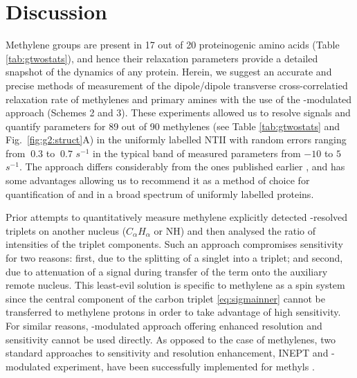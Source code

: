 \documentclass[twocolumn]{svjour3}           %
\begin{document}
\section{Discussion}
Methylene groups are present in 17 out of 20 proteinogenic amino acids
(Table \ref{tab:gtwostats}), and hence their relaxation parameters provide a detailed
snapshot of the dynamics of any protein. Herein, we suggest an accurate 
and precise methods of measurement of the dipole/dipole transverse
cross-correlatied relaxation rate \gtwo{} of me\-thy\-le\-nes and primary 
amines with 
the use of the \oneJch-modulated approach (Schemes 2 and 3). These 
experiments allowed us to resolve signals and
quantify \gtwoCH{} parameters for 89 out of 90 methylenes 
(see Table \ref{tab:gtwostats} and Fig.~\ref{fig:g2:struct}A) 
in the uniformly \nclab{} labelled {NTII} with random errors ranging 
from $~0.3$ to $~0.7$ $s^{-1}$ in the typical band of measured parameters 
from $-10$ to $5$ $s^{-1}$. The approach differs considerably from the ones
published earlier \cite{banci_side_2001,zheng_measurement_2004}, and has
some advantages allowing us to recommend it as a method of choice for
quantification of \gtwoCH{} and \gtwoNH{} in a broad spectrum of 
uniformly \nclab{} labelled proteins.

Prior attempts to quantitatively measure methylene \gtwoCH{} 
\cite{banci_side_2001,zheng_measurement_2004} explicitly detected
\oneJch-resolved triplets on another nucleus ($C_\alpha H_\alpha$ or NH) 
and then analysed the ratio of intensities of the triplet components.
Such an approach compromises sensitivity for two reasons: first, due 
to the splitting of a singlet into a triplet; and second, due to 
attenuation of a signal during transfer of the term onto the 
auxiliary remote nucleus. This least-evil solution is specific to 
methylene as a spin system since the central component of the carbon 
triplet \eqref{eq:sigmainner} cannot be transferred to methylene 
protons \cite{zhang_probing_2006} in order to take
advantage of high sensitivity. For similar reasons, \oneJch-modulated
approach offering enhanced resolution and sensitivity cannot be used
directly. As opposed to the case of methylenes, two standard approaches 
to sensitivity and resolution enhancement, {INEPT} and 
\oneJch-modulated experiment, have been successfully implemented for 
methyls \cite{zhang_probing_2006,lesovoy_nmr_2017}. 
\end{document}
